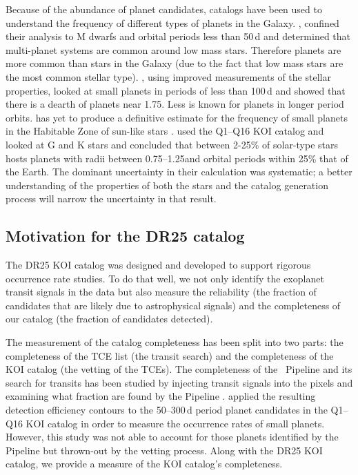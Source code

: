 Because of the abundance of planet candidates, \Kepler{} catalogs have been used to understand the frequency of different types of planets in the Galaxy. \citet{Dressing2013,Dressing2015}, confined their analysis to M dwarfs and orbital periods less than 50\,d and determined that multi-planet systems are common around low mass stars.  Therefore planets are more common than stars in the Galaxy (due to the fact that low mass stars are the most common stellar type). \citep{Fulton2017}, using improved measurements of the stellar properties, looked at small planets in periods of less than 100\,d and showed that there is a dearth of planets near 1.75\re. Less is known for planets in longer period orbits. \Kepler{} has yet to produce a definitive estimate for the frequency of small planets in the Habitable Zone of sun-like stars \citep[see e.g.][]{ForemanMackey2016, Petigura2013b, Burke2015}. \citet{Burke2015} used the Q1--Q16 \citep{Mullally2015cat} KOI catalog and looked at G and K stars and concluded that between 2-25\% of solar-type stars hosts planets with radii between 0.75--1.25\re and orbital periods within 25\% that of the Earth. The dominant uncertainty in their calculation was systematic; a better understanding of the properties of both the stars and the catalog generation process will narrow the uncertainty in that result. 

 

\subsection{Motivation for the DR25 catalog}

The DR25 KOI catalog was designed and developed to support rigorous occurrence rate studies. To do that well, we not only identify the exoplanet transit signals in the data but also measure the reliability (the fraction of candidates that are likely due to astrophysical signals) and the completeness of our catalog (the fraction of candidates detected).

The measurement of the catalog completeness has been split into two parts: the completeness of the TCE list (the transit search) and the completeness of the KOI catalog (the vetting of the TCEs). The completeness of the \Kepler\ Pipeline and its search for transits has been studied by injecting transit signals into the pixels and examining what fraction are found by the Pipeline \citep{Christiansen2017, Christiansen2015b,Christiansen2013a}. \citet{Burke2015} applied the resulting detection efficiency contours to the 50--300\,d period planet candidates in the Q1--Q16 KOI catalog \citep{Mullally2015cat} in order to measure the occurrence rates of small planets. However, this study was not able to account for those planets identified by the \Kepler{} Pipeline but thrown-out by the vetting process. Along with the DR25 KOI catalog, we provide a measure of the KOI catalog's completeness.

